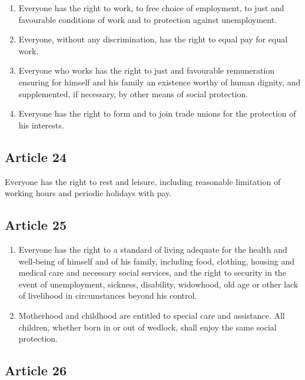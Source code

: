 \documentclass[
  titlepage,
  openright,
  DIV=calc,
  toc=listof,
  listof=nochaptergap]{scrbook}
\begin{document}
\begin{enumerate}
\def\labelenumi{\arabic{enumi}.}
\item
  Everyone has the right to work, to free choice of employment, to just
  and favourable conditions of work and to protection against
  unemployment.
\item
  Everyone, without any discrimination, has the right to equal pay for
  equal work.
\item
  Everyone who works has the right to just and favourable remuneration
  ensuring for himself and his family an existence worthy of human
  dignity, and supplemented, if necessary, by other means of social
  protection.
\item
  Everyone has the right to form and to join trade unions for the
  protection of his interests.
\end{enumerate}

\subsection{Article 24}\label{article-24-4}

Everyone has the right to rest and leisure, including reasonable
limitation of working hours and periodic holidays with pay.

\subsection{Article 25}\label{article-25-4}

\begin{enumerate}
\def\labelenumi{\arabic{enumi}.}
\item
  Everyone has the right to a standard of living adequate for the health
  and well-being of himself and of his family, including food, clothing,
  housing and medical care and necessary social services, and the right
  to security in the event of unemployment, sickness, disability,
  widowhood, old age or other lack of livelihood in circumstances beyond
  his control.
\item
  Motherhood and childhood are entitled to special care and assistance.
  All children, whether born in or out of wedlock, shall enjoy the same
  social protection.
\end{enumerate}

\subsection{Article 26}\label{article-26-4}
\end{document}
